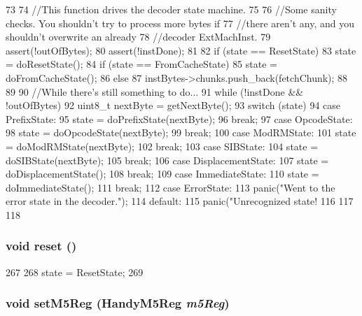\begin{DoxyCode}
73 {
74     //This function drives the decoder state machine.
75 
76     //Some sanity checks. You shouldn't try to process more bytes if
77     //there aren't any, and you shouldn't overwrite an already
78     //decoder ExtMachInst.
79     assert(!outOfBytes);
80     assert(!instDone);
81 
82     if (state == ResetState)
83         state = doResetState();
84     if (state == FromCacheState) {
85         state = doFromCacheState();
86     } else {
87         instBytes->chunks.push_back(fetchChunk);
88     }
89 
90     //While there's still something to do...
91     while (!instDone && !outOfBytes) {
92         uint8_t nextByte = getNextByte();
93         switch (state) {
94           case PrefixState:
95             state = doPrefixState(nextByte);
96             break;
97           case OpcodeState:
98             state = doOpcodeState(nextByte);
99             break;
100           case ModRMState:
101             state = doModRMState(nextByte);
102             break;
103           case SIBState:
104             state = doSIBState(nextByte);
105             break;
106           case DisplacementState:
107             state = doDisplacementState();
108             break;
109           case ImmediateState:
110             state = doImmediateState();
111             break;
112           case ErrorState:
113             panic("Went to the error state in the decoder.\n");
114           default:
115             panic("Unrecognized state! %
116         }
117     }
118 }
\end{DoxyCode}
\hypertarget{classX86ISA_1_1Decoder_ad20897c5c8bd47f5d4005989bead0e55}{
\subsubsection[{reset}]{\setlength{\rightskip}{0pt plus 5cm}void reset ()}}
\label{classX86ISA_1_1Decoder_ad20897c5c8bd47f5d4005989bead0e55}



\begin{DoxyCode}
267     {
268         state = ResetState;
269     }
\end{DoxyCode}
\hypertarget{classX86ISA_1_1Decoder_a9b8f4112d3bbb779584ef8aaee237b25}{
\subsubsection[{setM5Reg}]{\setlength{\rightskip}{0pt plus 5cm}void setM5Reg (HandyM5Reg {\em m5Reg})}}
\label{classX86ISA_1_1Decoder_a9b8f4112d3bbb779584ef8aaee237b25}



